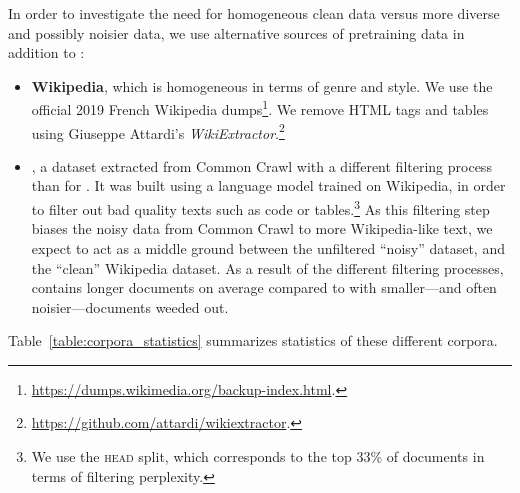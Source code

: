 In order to investigate the need for homogeneous clean data versus more diverse and possibly noisier data, we use alternative sources of pretraining data in addition to \oscar:
\begin{itemize}
    \item \textbf{Wikipedia}, which is homogeneous in terms of genre and style. We use the official 2019 French Wikipedia dumps\footnote{ \url{https://dumps.wikimedia.org/backup-index.html}.}. We remove HTML tags and tables using Giuseppe Attardi's  \emph{WikiExtractor}.\footnote{ \url{https://github.com/attardi/wikiextractor}.}
    \item \textbf{\ccnet} \cite{wenzek2019ccnet}, a dataset extracted from Common Crawl with a different filtering process than for \oscar. It was built using a language model trained on Wikipedia, in order to filter out bad quality texts such as code or tables.\footnote{We use the \textsc{head} split, which corresponds to the top 33\% of documents in terms of filtering perplexity.} As this filtering step biases the noisy data from Common Crawl to more Wikipedia-like text, we expect \ccnet to act as a middle ground between the unfiltered ``noisy'' \oscar dataset, and the ``clean'' Wikipedia dataset. As a result of the different filtering processes, \ccnet contains longer documents on average compared to \oscar with smaller---and often noisier---documents weeded out.
\end{itemize}
Table~\ref{table:corpora_statistics} summarizes statistics of these different corpora.

\begin{table}[ht]
    \centering\small
    \caption{Statistics on the pretraining datasets used.}
    \label{table:corpora_statistics}
\end{table}

